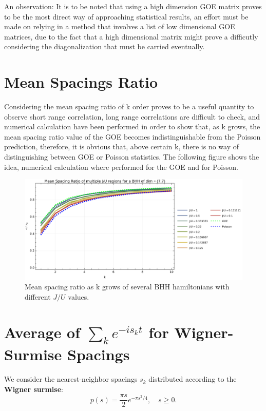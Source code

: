 \documentclass[10pt,a4paper]{article}
\begin{document}
An observation: It is to be noted that using a high dimension GOE matrix proves to be the most direct way of approaching statistical results,
 an effort must be made on relying in a method that involves a list of low dimensional GOE matrices, due to the fact that 
 a high dimensional matrix might prove a difficutly considering the diagonalization that must be carried eventually.

\section{Mean Spacings Ratio}
Considering the mean spacing ratio of k order proves to be a useful quantity to observe short range correlation, long range correlations 
are difficult to check, and numerical calculation have been performed in order to show that, as k grows, the mean spacing ratio 
value of the GOE becomes indistinguishable from the Poisson prediction, therefore, it is obvious that, above certain k, there is 
no way of distinguishing between GOE or Poisson statistics. The following figure shows the idea, numerical calculation where 
performed for the GOE and for Poisson.

\begin{figure}[H]
    \centering
    \includegraphics[width=1\textwidth]{KorderCurves.pdf}
    \caption{Mean spacing ratio as k grows of several BHH hamiltonians with different $J/U$ values. }
    \label{fig:KorderCurves}
\end{figure}

\appendix
\section{Average of $\sum_k e^{-i s_k t}$ for Wigner-Surmise Spacings}

We consider the nearest-neighbor spacings $s_k$ distributed according to the \textbf{Wigner surmise}:
\[
p(s) = \frac{\pi s}{2} e^{-\pi s^2 / 4}, \quad s \geq 0.
\]
\end{document}
